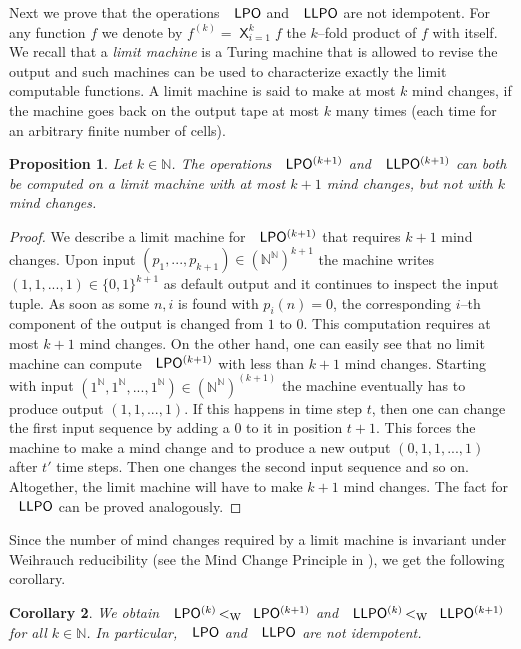 \documentclass[jsl,10pt]{noasl}
\def\IN{{\mathbb{N}}}
\def\LPO{\text{\rm\sffamily LPO}}
\def\LLPO{\text{\rm\sffamily LLPO}}
\def\LPO{\text{\rm\sffamily LPO}}
\def\LLPO{\text{\rm\sffamily LLPO}}
\def\lW{\mathop{<_{\mathrm{W}}}}
\def\bigtimes{\mathop{\mathsf{X}}}
\newtheorem{proposition}{Proposition}[section]
\newtheorem{corollary}[proposition]{Corollary}
\begin{document}
Next we prove that the operations $\LPO$ and $\LLPO$ are not idempotent.
For any function $f$ we denote by $f^{(k)}=\bigtimes_{i=1}^k f$ the $k$--fold
product of $f$ with itself. We recall that a {\em limit machine} is a Turing
machine that is allowed to revise the output and such machines can be 
used to characterize exactly the limit computable functions. A limit
machine is said to make at most $k$ mind changes, if the machine goes back
on the output tape at most $k$ many times (each time for an arbitrary finite number of cells).

\begin{proposition}
\label{prop:LPO-LLPO-mind-change}
Let $k\in\IN$.
The operations $\LPO^{(k+1)}$ and $\LLPO^{(k+1)}$ can both be computed
on a limit machine with at most $k+1$ mind changes, but not with $k$ mind changes.
\end{proposition}
\begin{proof}
We describe a limit machine for $\LPO^{(k+1)}$ that requires $k+1$
mind changes. Upon input $(p_1,...,p_{k+1})\in(\IN^\IN)^{k+1}$ the machine
writes $(1,1,...,1)\in\{0,1\}^{k+1}$ as default output and it continues
to inspect the input tuple. As soon as some $n,i$ is found with $p_i(n)=0$,
the corresponding $i$--th component of the output is changed from $1$ to $0$.
This computation requires at most $k+1$ mind changes.
On the other hand, one can easily see that no limit machine can compute
$\LPO^{(k+1)}$ with less than $k+1$ mind changes. Starting with input
$(1^\IN,1^\IN,...,1^\IN)\in(\IN^\IN)^{(k+1)}$ the machine eventually
has to produce output $(1,1,...,1)$. If this happens in time step $t$,
then one can change the first input sequence by adding a $0$ to it
in position $t+1$. This forces the machine to make a mind change and
to produce a new output $(0,1,1,...,1)$ after $t'$ time steps.
Then one changes the second input sequence and so on. Altogether,
the limit machine will have to make $k+1$ mind changes.
The fact for $\LLPO$ can be proved analogously.
\end{proof}

Since the number of mind changes required by a limit machine is invariant
under Weihrauch reducibility (see the Mind Change Principle in \cite{BG09b}),
we get the following corollary.

\begin{corollary}
\label{cor:LPO-LLPO-idempotency}
We obtain $\LPO^{(k)}\lW\LPO^{(k+1)}$ and $\LLPO^{(k)}\lW\LLPO^{(k+1)}$ for all $k\in\IN$.
In particular, $\LPO$ and $\LLPO$ are not idempotent.
\end{corollary}
\end{document}
